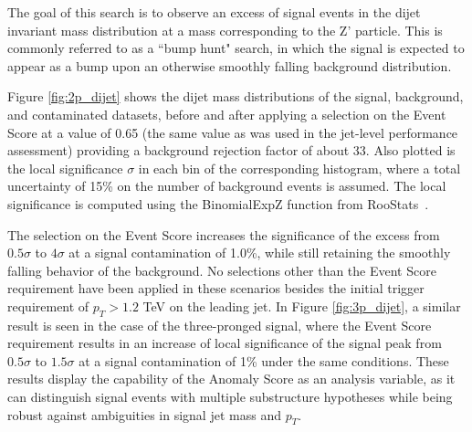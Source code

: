 \documentclass[11pt, a4paper]{article}
\begin{document}
The goal of this search is to observe an excess of signal events in the dijet invariant mass distribution at a mass corresponding to the Z' particle. 
This is commonly referred to as a ``bump hunt" search, in which the signal is expected to appear as a bump upon an otherwise smoothly falling background distribution. 

Figure \ref{fig:2p_dijet} shows the dijet mass distributions of the signal, background, and contaminated datasets, before and after applying a selection on the Event Score at a value of 0.65 (the same value as was used in the jet-level performance assessment) providing a background rejection factor of about 33. Also plotted is the local significance $\sigma$ in each bin of the corresponding histogram, where a total uncertainty of 15\% on the number of background events is assumed. The local significance is computed using the {\sc BinomialExpZ} function from {\sc RooStats}~\cite{moneta2011roostats}. 

The selection on the Event Score increases the significance of the excess from $0.5\sigma$ to $4\sigma$ at a signal contamination of 1.0\%, while still retaining the smoothly falling behavior of the background. No selections other than the Event Score requirement have been applied in these scenarios besides the initial trigger requirement of $p_{T} > 1.2$ TeV on the leading jet. In Figure \ref{fig:3p_dijet}, a similar result is seen in the case of the three-pronged signal, where the Event Score requirement results in an increase of local significance of the signal peak from $0.5\sigma$ to $1.5\sigma$ at a signal contamination of 1\% under the same conditions. These results display the capability of the Anomaly Score as an analysis variable, as it can distinguish signal events with multiple substructure hypotheses while being robust against ambiguities in signal jet mass and $p_{T}$.
\end{document}
